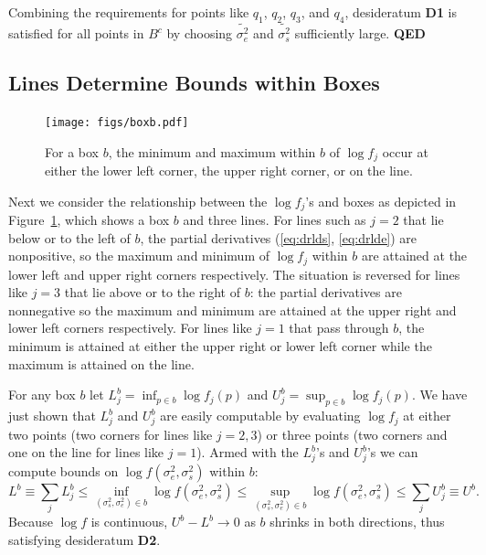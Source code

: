 \documentclass{report}
\newcommand{\RL}{f}
\newcommand{\logRL}{\log\RL}
\newcommand{\sigssq}{\sigma_s^2}
\newcommand{\sigesq}{\sigma_e^2}
\newcommand{\logRLss}{\logRL(\sigesq,\sigssq)}
\begin{document}
Combining the requirements for points like $q_1$, $q_2$, $q_3$, and $q_4$, desideratum \textbf{D1} is satisfied for all points in $B^c$ by choosing $\widetilde{\sigma_e^2}$ and $\widetilde{\sigma_s^2}$ sufficiently large.  \textbf{QED}\\



\subsection{Lines Determine Bounds within Boxes}
\label{sec:boundsinboxes}
\begin{figure}
	\centering
	\texttt{[image: figs/boxb.pdf]}
	\caption{For a box $b$,  the minimum and
	maximum within $b$ of $\logRL_j$
	occur at either the lower left corner, the upper right  corner, or
	on the line.
}	\label{fig:boxb}
\end{figure}
Next we consider the relationship between the $\logRL_j$'s and boxes as depicted in Figure~\ref{fig:boxb}, which shows a box $b$ and three lines.  For lines such as $j=2$ that lie below or to the left of $b$, the partial derivatives (\ref{eq:drlds}, \ref{eq:drlde}) are nonpositive, so the maximum and minimum of $\logRL_j$ within $b$ are attained at the lower left and upper right corners respectively.  The situation is reversed for lines like $j=3$ that lie above or to the right of $b$: the partial derivatives are nonnegative so the maximum and minimum are attained at the upper right and lower left corners respectively.  For lines like $j=1$ that pass through $b$, the minimum is attained at either the upper right or lower left corner while the maximum is attained on the line.

For any box $b$ let $L^b_j = \inf_{p\in b} \logRL_j(p)$ and $U^b_j = \sup_{p\in b} \logRL_j(p)$.  We have just shown that $L^b_j$ and $U^b_j$ are easily computable by evaluating $\logRL_j$ at either two points (two corners for lines like $j=2,3$) or three points (two corners and one on the line for lines like $j=1$).
Armed with the $L^b_j$'s and $U^b_j$'s we can compute bounds on $\logRLss$ within $b$:
\begin{equation}
\label{eq:bounds}
	L^b \equiv \sum_j L^b_j \le \inf_{(\sigssq,\sigesq)\in b} \logRLss \le
	\sup_{(\sigssq,\sigesq)\in b} \logRLss \le \sum_j U^b_j \equiv U^b.
\end{equation}
Because $\logRL$ is continuous, $U^b - L^b \rightarrow 0$ as $b$ shrinks in both directions, thus satisfying desideratum \textbf{D2}.
\end{document}
